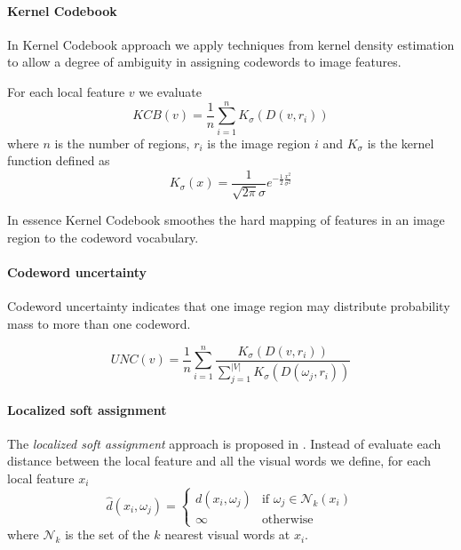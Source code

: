 \paragraph{Kernel Codebook}

In Kernel Codebook approach we apply techniques from kernel density estimation to allow a degree of ambiguity in assigning codewords to image features. 

For each local feature $v$ we evaluate
$$KCB(v) = \frac{1}{n} \sum_{i = 1}^{n} K_{\sigma}(D(v, r_i))$$
where $n$ is the number of regions, $r_i$ is the image region $i$ and $K_{\sigma}$ is the kernel function defined as
$$K_{\sigma} (x) = \frac{1}{\sqrt{2\pi} \sigma} e^{- \frac{1}{2} \frac{x^2}{\sigma^2}}$$

In essence Kernel Codebook smoothes the hard mapping of features in an image region to the codeword vocabulary.

\paragraph{Codeword uncertainty}

Codeword uncertainty indicates that one image region may distribute probability mass to more than one codeword.

$$UNC(v) = \frac{1}{n} \sum_{i = 1}^{n} \frac{K_{\sigma}(D(v, r_i))}{\sum_{j=1}^{|V|} K_{\sigma}(D(\omega_j, r_i))}$$

\paragraph{Localized soft assignment}

The \emph{localized soft assignment} approach is proposed in \cite{LingqiaoLiu:2011:DSC:2355573.2356438}. Instead of evaluate each distance between the local feature and all the visual words we define, for each local feature $x_i$
$$\hat{d}(x_i, \omega_j) =
\left\{
\begin{array}{ll}
d(x_i, \omega_j) & \mbox{if } \omega_j \in \mathcal{N}_k(x_i) \\
\infty & \mbox{otherwise}
\end{array}
\right.$$
where $\mathcal{N}_k$ is the set of the $k$ nearest visual words at $x_i$.
